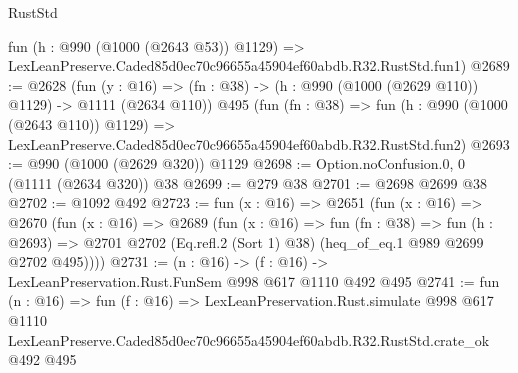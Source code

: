 \begin{lexlean}{RustStd}
\begin{coremodule}
    fun (h : @990 (@1000 (@2643 @53)) @1129) =>
    LexLeanPreserve.Caded85d0ec70c96655a45904ef60abdb.R32.RustStd.fun1)
@2689 := @2628
    (fun (y : @16) => (fn : @38) -> (h : @990 (@1000 (@2629 @110)) @1129) -> @1111 (@2634 @110))
    @495
    (fun (fn : @38) =>
    fun (h : @990 (@1000 (@2643 @110)) @1129) =>
    LexLeanPreserve.Caded85d0ec70c96655a45904ef60abdb.R32.RustStd.fun2)
@2693 := @990 (@1000 (@2629 @320)) @1129
@2698 := Option.noConfusion.{0, 0} (@1111 (@2634 @320)) @38
@2699 := @279 @38
@2701 := @2698 @2699 @38
@2702 := @1092 @492
@2723 := fun (x : @16) =>
  @2651
    (fun (x : @16) =>
    @2670
      (fun (x : @16) =>
      @2689
        (fun (x : @16) =>
        fun (fn : @38) =>
        fun (h : @2693) =>
        @2701 @2702 (Eq.refl.{2} (Sort 1) @38) (heq_of_eq.{1} @989 @2699 @2702 @495))))
@2731 := (n : @16) -> (f : @16) -> LexLeanPreservation.Rust.FunSem @998 @617 @1110 @492 @495
@2741 := fun (n : @16) =>
  fun (f : @16) =>
  LexLeanPreservation.Rust.simulate
    @998
    @617
    @1110
    LexLeanPreserve.Caded85d0ec70c96655a45904ef60abdb.R32.RustStd.crate_ok
    @492
    @495
\end{coremodule}
\end{lexlean}
